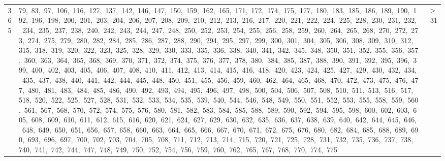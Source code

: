 \begin{longtable}{c|p{}|r}
365 & 79,\ 83,\ 97,\ 106,\ 116,\ 127,\ 137,\ 142,\ 146,\ 147,\ 150,\ 159,\ 162,\ 165,\ 171,\ 172,\ 174,\ 175,\ 177,\ 180,\ 183,\ 185,\ 186,\ 189,\ 190,\ 192,\ 196,\ 198,\ 200,\ 201,\ 203,\ 204,\ 206,\ 207,\ 208,\ 209,\ 210,\ 212,\ 213,\ 216,\ 217,\ 220,\ 221,\ 222,\ 224,\ 225,\ 228,\ 230,\ 231,\ 232,\ 234,\ 235,\ 237,\ 238,\ 240,\ 242,\ 243,\ 244,\ 247,\ 248,\ 250,\ 252,\ 253,\ 254,\ 255,\ 256,\ 258,\ 259,\ 260,\ 264,\ 265,\ 268,\ 270,\ 272,\ 273,\ 274,\ 275,\ 279,\ 280,\ 282,\ 284,\ 285,\ 286,\ 287,\ 288,\ 290,\ 294,\ 295,\ 297,\ 299,\ 300,\ 301,\ 304,\ 305,\ 306,\ 308,\ 309,\ 310,\ 312,\ 315,\ 318,\ 319,\ 320,\ 322,\ 323,\ 325,\ 328,\ 329,\ 330,\ 333,\ 335,\ 336,\ 338,\ 340,\ 341,\ 342,\ 345,\ 348,\ 350,\ 351,\ 352,\ 355,\ 356,\ 357,\ 360,\ 363,\ 364,\ 365,\ 368,\ 369,\ 370,\ 371,\ 372,\ 374,\ 375,\ 376,\ 377,\ 378,\ 380,\ 384,\ 385,\ 387,\ 388,\ 390,\ 391,\ 392,\ 395,\ 396,\ 399,\ 400,\ 402,\ 403,\ 405,\ 406,\ 407,\ 408,\ 410,\ 411,\ 412,\ 413,\ 414,\ 415,\ 416,\ 418,\ 420,\ 423,\ 424,\ 425,\ 427,\ 429,\ 430,\ 432,\ 434,\ 435,\ 437,\ 438,\ 440,\ 441,\ 442,\ 444,\ 445,\ 448,\ 450,\ 451,\ 455,\ 456,\ 459,\ 460,\ 462,\ 464,\ 465,\ 468,\ 470,\ 472,\ 473,\ 475,\ 476,\ 477,\ 480,\ 481,\ 483,\ 484,\ 485,\ 486,\ 490,\ 492,\ 493,\ 494,\ 495,\ 496,\ 497,\ 498,\ 500,\ 504,\ 506,\ 507,\ 508,\ 510,\ 511,\ 513,\ 516,\ 517,\ 518,\ 520,\ 522,\ 525,\ 527,\ 528,\ 531,\ 532,\ 533,\ 534,\ 535,\ 539,\ 540,\ 544,\ 546,\ 548,\ 549,\ 550,\ 551,\ 552,\ 553,\ 555,\ 558,\ 559,\ 560,\ 561,\ 567,\ 568,\ 570,\ 572,\ 574,\ 575,\ 576,\ 580,\ 581,\ 582,\ 583,\ 584,\ 585,\ 588,\ 589,\ 590,\ 592,\ 594,\ 595,\ 598,\ 600,\ 602,\ 603,\ 605,\ 608,\ 609,\ 610,\ 611,\ 612,\ 615,\ 616,\ 620,\ 621,\ 624,\ 627,\ 629,\ 630,\ 632,\ 635,\ 636,\ 637,\ 638,\ 639,\ 640,\ 642,\ 644,\ 645,\ 646,\ 648,\ 649,\ 650,\ 651,\ 656,\ 657,\ 658,\ 660,\ 663,\ 664,\ 665,\ 666,\ 667,\ 670,\ 671,\ 672,\ 675,\ 676,\ 680,\ 682,\ 684,\ 685,\ 688,\ 689,\ 690,\ 693,\ 696,\ 697,\ 700,\ 702,\ 703,\ 704,\ 705,\ 708,\ 711,\ 712,\ 713,\ 714,\ 715,\ 720,\ 721,\ 725,\ 728,\ 731,\ 732,\ 735,\ 736,\ 737,\ 738,\ 740,\ 741,\ 742,\ 744,\ 747,\ 748,\ 749,\ 750,\ 752,\ 754,\ 756,\ 759,\ 760,\ 762,\ 765,\ 767,\ 768,\ 770,\ 774,\ 775 & $\ge$ 31 \\

\end{longtable}
